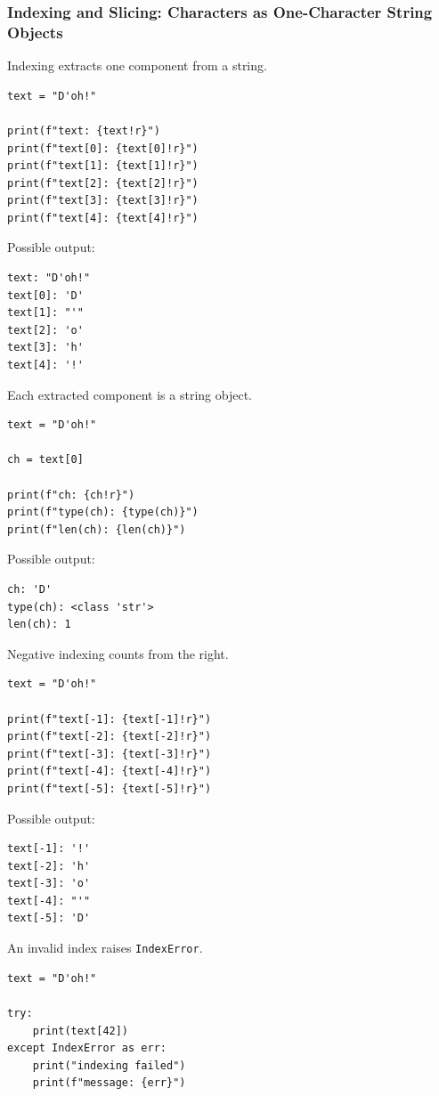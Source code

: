 \subsubsection{Indexing and Slicing: Characters as One-Character String Objects}

Indexing extracts one component from a string.

\begin{verbatim}
text = "D'oh!"

print(f"text: {text!r}")
print(f"text[0]: {text[0]!r}")
print(f"text[1]: {text[1]!r}")
print(f"text[2]: {text[2]!r}")
print(f"text[3]: {text[3]!r}")
print(f"text[4]: {text[4]!r}")
\end{verbatim}

Possible output:

\begin{verbatim}
text: "D'oh!"
text[0]: 'D'
text[1]: "'"
text[2]: 'o'
text[3]: 'h'
text[4]: '!'
\end{verbatim}

Each extracted component is a string object.

\begin{verbatim}
text = "D'oh!"

ch = text[0]

print(f"ch: {ch!r}")
print(f"type(ch): {type(ch)}")
print(f"len(ch): {len(ch)}")
\end{verbatim}

Possible output:

\begin{verbatim}
ch: 'D'
type(ch): <class 'str'>
len(ch): 1
\end{verbatim}

Negative indexing counts from the right.

\begin{verbatim}
text = "D'oh!"

print(f"text[-1]: {text[-1]!r}")
print(f"text[-2]: {text[-2]!r}")
print(f"text[-3]: {text[-3]!r}")
print(f"text[-4]: {text[-4]!r}")
print(f"text[-5]: {text[-5]!r}")
\end{verbatim}

Possible output:

\begin{verbatim}
text[-1]: '!'
text[-2]: 'h'
text[-3]: 'o'
text[-4]: "'"
text[-5]: 'D'
\end{verbatim}

An invalid index raises \texttt{IndexError}.

\begin{verbatim}
text = "D'oh!"

try:
    print(text[42])
except IndexError as err:
    print("indexing failed")
    print(f"message: {err}")
\end{verbatim}


